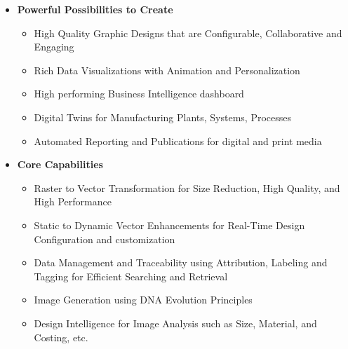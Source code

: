 \documentclass{ammTalk}
\begin{document}
\begin{itemize}[itemsep=6mm]\LARGE
\item \textbf{Powerful Possibilities to Create}
\begin{itemize}\Large
\item High Quality Graphic Designs that are Configurable, Collaborative and Engaging
\item Rich Data Visualizations with Animation and Personalization
\item High performing Business Intelligence dashboard
\item Digital Twins for Manufacturing Plants, Systems, Processes
\item Automated Reporting and Publications for digital and print media
\end{itemize}
\item \textbf{Core Capabilities}
\begin{itemize}\Large
\item Raster to Vector Transformation for Size Reduction, High Quality, and High Performance
\item Static to Dynamic Vector Enhancements for Real-Time Design Configuration and customization
\item Data Management and Traceability using Attribution, Labeling and Tagging for Efficient Searching and Retrieval
\item Image Generation using DNA Evolution Principles
\item Design Intelligence for Image Analysis such as Size, Material, and Costing, etc.
\end{itemize}
\end{itemize}
\end{document}
